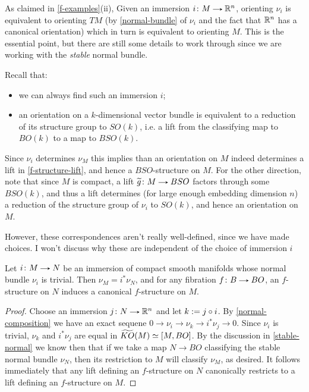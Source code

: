 \begin{remarks} \label{f-structure-explanation}
  As claimed in \eqref{f-examples}(ii), Given an immersion $i \c M \to
  \R^n$, orienting $\nu_i$ is equivalent to orienting $TM$ (by
  \eqref{normal-bundle} of $\nu_i$ and the fact that $\mathbb{R}^n$ has a
  canonical orientation) which in turn is equivalent to orienting
  $M$. This is the essential point, but there are still some details
  to work through since we are working with the \emph{stable} normal
  bundle.

  Recall that:
  \begin{itemize}
  \item we can always find such an immersion $i$;
  \item an orientation on a $k$-dimensional vector bundle is
    equivalent to a reduction of its structure group to $SO(k)$,
    i.e. a lift from the classifying map to $BO(k)$ to a map to
    $BSO(k)$.
  \end{itemize}
  Since $\nu_i$ determines $\nu_M$ this implies than an orientation on
  $M$ indeed determines a lift in \eqref{f-structure-lift}, and hence a
  $BSO$-structure on $M$. For the other direction, note that since $M$
  is compact, a lift $\til g \c M \to BSO$ factors through some
  $BSO(k)$, and thus a lift determines (for large enough embedding
  dimension $n$) a reduction of the structure group of $\nu_i$ to
  $SO(k)$, and hence an orientation on $M$.

  However, these correspondences aren't really well-defined, since we
  have made choices. I won't discuss why these are independent of the
  choice of immersion $i$
\end{remarks}

\begin{proposition} \label{trivial-normal}
  Let $i \c M \to N$ be an immersion of compact smooth manifolds whose
  normal bundle $\nu_i$ is trivial. Then $\nu_M = i^*\nu_N$, and for
  any fibration $f \c B \to BO$, an $f$-structure on $N$ induces a
  canonical $f$-structure on $M$.
\end{proposition}

\begin{proof}
  Choose an immersion $j \c N \to \R^n$ and let $k \mathrel{:=} j \circ i$. By
  \eqref{normal-composition} we have an exact sequene $0 \to \nu_i \to
  \nu_k \to i^*\nu_j \to 0$. Since $\nu_i$ is trivial, $\nu_k$ and
  $i^*\nu_j$ are equal in $\widetilde{KO}(M) \simeq [M,BO]$. By the discussion
  in \eqref{stable-normal} we know then that if we take a map $N \to BO$
  classifying the stable normal bundle $\nu_N$, then its restriction
  to $M$ will classify $\nu_M$, as desired. It follows immediately
  that any lift defining an $f$-structure on $N$ canonically restricts
  to a lift defining an $f$-structure on $M$.
\end{proof}

